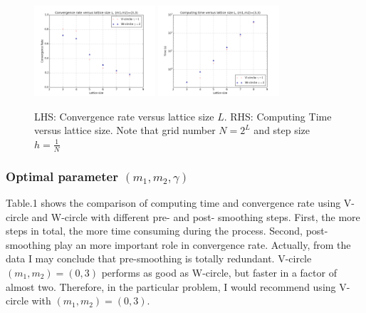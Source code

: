 \documentclass[12pt]{article}
\begin{document}
\begin{figure}[h!]
	\begin{center}
		\includegraphics[width=0.4\textwidth]{rate_size.png}
		\includegraphics[width=0.4\textwidth]{time_size.png}
		\caption{LHS: Convergence rate versus lattice size $L$. RHS: Computing Time versus lattice size. Note that grid number $N=2^L$ and step size $h=\frac{1}{N}$}
		\label{fig5}
	\end{center}
\end{figure}



\subsubsection{Optimal parameter $(m_1,m_2,\gamma)$}
Table.1 shows the comparison of computing time and convergence rate using V-circle and W-circle with different pre- and post- smoothing steps. First, the more steps in total, the more time consuming during the process. Second, post-smoothing play an more important role in convergence rate. Actually, from the data I may conclude that pre-smoothing is totally redundant. V-circle $(m_1,m_2)=(0,3)$ performs as good as W-circle, but faster in a factor of almost two. Therefore, in the particular problem, I would recommend using V-circle with $(m_1,m_2)=(0,3)$.
\end{document}
